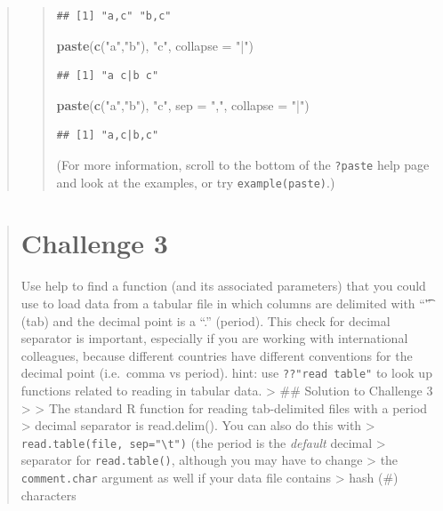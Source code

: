 \documentclass[]{book}
\newenvironment{Shaded}{\begin{snugshade}}{\end{snugshade}}
\newcommand{\KeywordTok}[1]{\textcolor[rgb]{0.13,0.29,0.53}{\textbf{#1}}}
\newcommand{\DataTypeTok}[1]{\textcolor[rgb]{0.13,0.29,0.53}{#1}}
\newcommand{\StringTok}[1]{\textcolor[rgb]{0.31,0.60,0.02}{#1}}
\newcommand{\NormalTok}[1]{#1}
\begin{document}
\begin{quote}
\begin{quote}
\begin{verbatim}
## [1] "a,c" "b,c"
\end{verbatim}

\begin{Shaded}
\begin{Highlighting}[]
\KeywordTok{paste}\NormalTok{(}\KeywordTok{c}\NormalTok{(}\StringTok{"a"}\NormalTok{,}\StringTok{"b"}\NormalTok{), }\StringTok{"c"}\NormalTok{, }\DataTypeTok{collapse =} \StringTok{"|"}\NormalTok{)}
\end{Highlighting}
\end{Shaded}

\begin{verbatim}
## [1] "a c|b c"
\end{verbatim}

\begin{Shaded}
\begin{Highlighting}[]
\KeywordTok{paste}\NormalTok{(}\KeywordTok{c}\NormalTok{(}\StringTok{"a"}\NormalTok{,}\StringTok{"b"}\NormalTok{), }\StringTok{"c"}\NormalTok{, }\DataTypeTok{sep =} \StringTok{","}\NormalTok{, }\DataTypeTok{collapse =} \StringTok{"|"}\NormalTok{)}
\end{Highlighting}
\end{Shaded}

\begin{verbatim}
## [1] "a,c|b,c"
\end{verbatim}

(For more information, scroll to the bottom of the \texttt{?paste} help
page and look at the examples, or try
\texttt{example(\textquotesingle{}paste\textquotesingle{})}.)
\end{quote}
\end{quote}

\begin{quote}
\section{Challenge 3}\label{challenge-3}

Use help to find a function (and its associated parameters) that you
could use to load data from a tabular file in which columns are
delimited with ``\t'' (tab) and the decimal point is a ``.'' (period).
This check for decimal separator is important, especially if you are
working with international colleagues, because different countries have
different conventions for the decimal point (i.e.~comma vs period).
hint: use \texttt{??"read\ table"} to look up functions related to
reading in tabular data. \textgreater{} \#\# Solution to Challenge 3
\textgreater{} \textgreater{} The standard R function for reading
tab-delimited files with a period \textgreater{} decimal separator is
read.delim(). You can also do this with \textgreater{}
\texttt{read.table(file,\ sep="\textbackslash{}t")} (the period is the
\emph{default} decimal \textgreater{} separator for
\texttt{read.table()}, although you may have to change \textgreater{}
the \texttt{comment.char} argument as well if your data file contains
\textgreater{} hash (\#) characters
\end{quote}
\end{document}
